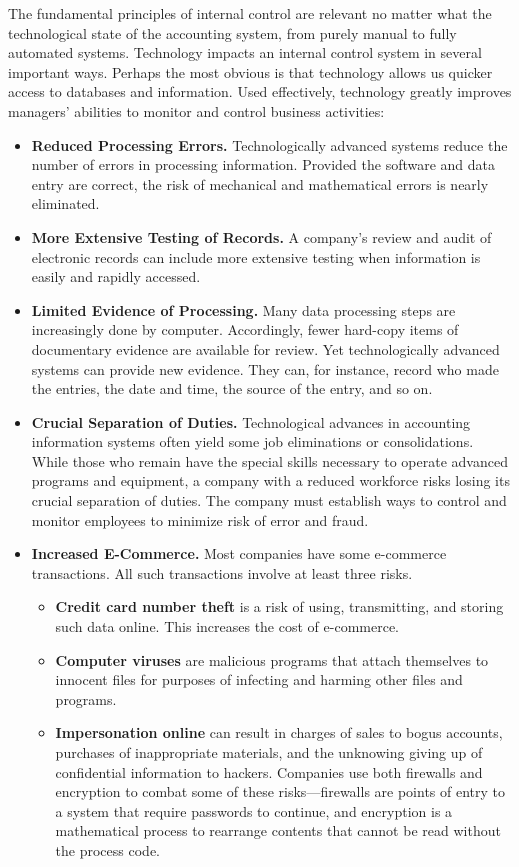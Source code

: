 \documentclass[../main.tex]{subfiles}
\begin{document}
	The fundamental principles of internal control are relevant no matter what 
	the technological state of the accounting system, from purely manual to 
	fully automated systems. Technology impacts an internal control system in 
	several important ways. Perhaps the most obvious is that technology allows 
	us quicker access to databases and information. Used effectively, 
	technology greatly improves managers’ abilities to monitor and control 
	business activities:
	\begin{itemize}[noitemsep]
		\item \textbf{Reduced Processing Errors.} Technologically advanced 
		systems 
		reduce the 
		number of errors in processing information. Provided the software and 
		data entry are correct, the risk of mechanical and mathematical errors 
		is nearly eliminated.
		\item \textbf{
			More Extensive Testing of Records.} A company’s review and audit of 
			electronic records can include more extensive testing when 
			information is easily and rapidly accessed.
		\item \textbf{Limited Evidence of Processing.} Many data processing 
		steps are increasingly done by computer. Accordingly, fewer hard-copy 
		items of documentary evidence are available for review. Yet 
		technologically advanced systems can provide new evidence. They can, 
		for instance, record who made the entries, the date and time, the 
		source of the entry, and so on.
		\item \textbf{Crucial Separation of Duties.} Technological advances in 
		accounting 
		information systems often yield some job eliminations or 
		consolidations. While those who remain have the special skills 
		necessary to operate advanced programs and equipment, a company with a 
		reduced workforce risks losing its crucial separation of duties. The 
		company must establish ways to control and monitor employees to 
		minimize risk of error and fraud.
		\item \textbf{Increased E-Commerce.} Most companies have some 
		e-commerce 
		transactions. All such transactions involve at least three risks. 
		\begin{itemize}[noitemsep]
			\item \textbf{Credit card number theft} is a risk of using, 
			transmitting, 
			and storing such data online. This increases the cost of e-commerce.
			\item \textbf{Computer 
			viruses} are malicious programs that attach themselves to innocent 
			files 
			for purposes of infecting and harming other files and programs.
			\item \textbf{Impersonation online} can result in charges of sales 
			to bogus accounts, 
			purchases of inappropriate materials, and the unknowing giving up 
			of 
			confidential information to hackers. Companies use both firewalls 
			and 
			encryption to combat some of these risks—firewalls are points of 
			entry 
			to a system that require passwords to continue, and encryption is a 
			mathematical process to rearrange contents that cannot be read 
			without 
			the process code.
		\end{itemize}
	\end{itemize}
	
\end{document}
